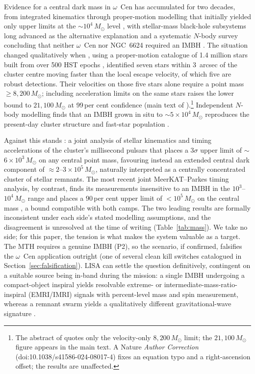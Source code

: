 \documentclass[11pt]{article}
\newcommand{\msun}{\ensuremath{M_\odot}}
\begin{document}
Evidence for a central dark mass in $\omega$~Cen has accumulated for two decades, from integrated kinematics \citep{Noyola2008} through proper-motion modelling that initially yielded only upper limits at the $\sim$$10^{4}\,\msun$ level \citep{vanderMarelAnderson2010}, with stellar-mass black-hole subsystems long advanced as the alternative explanation \citep{Zocchi2019,BreenHeggie2013} and a systematic $N$-body survey concluding that neither $\omega$~Cen nor NGC~6624 required an IMBH \citep{Baumgardt2019}. The situation changed qualitatively when \citet{Haberle2024Nature}, using a proper-motion catalogue of 1.4 million stars built from over 500 HST epochs \citep{Haberle2024oMEGACatII}, identified seven stars within 3~arcsec of the cluster centre moving faster than the local escape velocity, of which five are robust detections. Their velocities on those five stars alone require a point mass $\geq 8{,}200\,\msun$; including acceleration limits on the same stars raises the lower bound to $21{,}100\,\msun$ at 99\,per cent confidence (main text of \citealt{Haberle2024Nature}).\footnote{The abstract of \citet{Haberle2024Nature} quotes only the velocity-only $8{,}200\,\msun$ limit; the $21{,}100\,\msun$ figure appears in the main text. A Nature \emph{Author Correction} (doi:10.1038/s41586-024-08017-4) fixes an equation typo and a right-ascension offset; the results are unaffected.} Independent $N$-body modelling finds that an IMBH grown in situ to $\sim$$5\times10^{4}\,\msun$ reproduces the present-day cluster structure and fast-star population \citep{GonzalezPrieto2025}.

Against this stands \citet{BanaresHernandez2025}: a joint analysis of stellar kinematics and timing accelerations of the cluster's millisecond pulsars that places a $3\sigma$ upper limit of $\sim$$6\times10^{3}\,\msun$ on any central point mass, favouring instead an extended central dark component of $\approx 2$--$3\times10^{5}\,\msun$, naturally interpreted as a centrally concentrated cluster of stellar remnants. The most recent joint MeerKAT--Parkes timing analysis, by contrast, finds its measurements insensitive to an IMBH in the $10^{3}$--$10^{4}\,\msun$ range and places a $90$\,per cent upper limit of $<10^{5}\,\msun$ on the central mass \citep{ColomiBernadich2026}, a bound compatible with both camps. The two leading results are formally inconsistent under each side's stated modelling assumptions, and the disagreement is unresolved at the time of writing (Table~\ref{tab:mass}). We take no side; for this paper, the tension is what makes the system valuable as a target. The MTH requires a genuine IMBH (P2), so the \citet{BanaresHernandez2025} scenario, if confirmed, falsifies the $\omega$~Cen application outright (one of several clean kill switches catalogued in Section~\ref{sec:falsification}). LISA can settle the question definitively, contingent on a suitable source being in-band during the mission: a single IMBH undergoing a compact-object inspiral yields resolvable extreme- or intermediate-mass-ratio-inspiral (EMRI/IMRI) signals with percent-level mass and spin measurement, whereas a remnant swarm yields a qualitatively different gravitational-wave signature \citep{AmaroSeoane2018,Babak2017,Colpi2024}.
\end{document}
